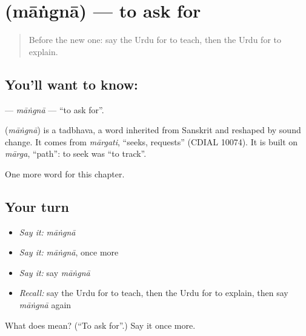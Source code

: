 \section[\texorpdfstring{\ur{مانگنا} (māṅgnā)}{مانگنا (māṅgnā)}]{ (māṅgnā) — to ask for}

\label{lesson:UR-C140-mangna}



\begin{quote}
Before the new one: say the Urdu for to teach, then the Urdu for to explain.
\end{quote}

\subsection*{You'll want to know: }
\textbf{} — \emph{māṅgnā} — \textquotedblleft{}to ask for\textquotedblright{}.

\begin{cousinweb}
\textbf{} (\emph{māṅgnā}) is a tadbhava, a word inherited from Sanskrit and reshaped by sound change. It comes from \emph{mārgati}, \textquotedblleft{}seeks, requests\textquotedblright{} (CDIAL 10074). It is built on \emph{mārga}, \textquotedblleft{}path\textquotedblright{}: to seek was \textquotedblleft{}to track\textquotedblright{}.
\end{cousinweb}

\begin{grammarlens}[title={What you've built}]
One more word for this chapter.
\end{grammarlens}

\subsection*{Your turn}
\begin{itemize}
\raggedright
  \item \emph{Say it:} \emph{māṅgnā}
  \item \emph{Say it:} \emph{māṅgnā}, once more
  \item \emph{Say it:} say \emph{māṅgnā}
  \item \emph{Recall:} say the Urdu for to teach, then the Urdu for to explain, then say \emph{māṅgnā} again
\end{itemize}

\begin{tcolorbox}[breakable,colback=teal!4,colframe=teal!35!black,title={Before you move on}]
What does  mean? (\textquotedblleft{}To ask for\textquotedblright{}.) Say it once more.
\end{tcolorbox}
